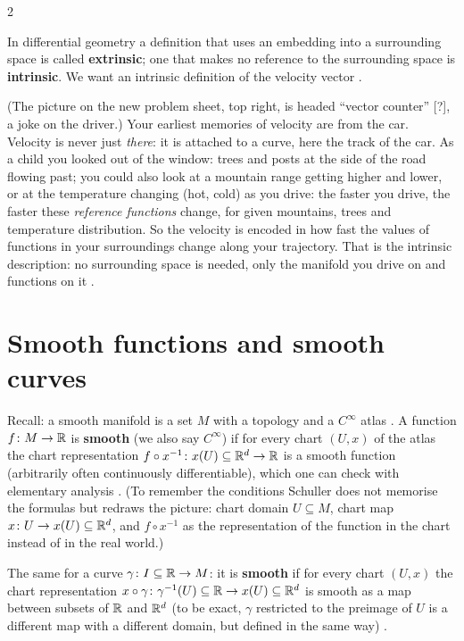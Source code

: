 \begin{paracol}{2}
\begin{definition}\label{def:ts-intrinsic}
In differential geometry a definition that uses an embedding into a surrounding space is called \textbf{extrinsic}; one that
makes no reference to the surrounding space is \textbf{intrinsic}. We want an intrinsic definition of the velocity vector
.
\end{definition}
\begin{intuition}
(The picture on the new problem sheet, top right, is headed ``vector counter'' [?], a joke on the driver.) Your earliest
memories of velocity are from the car. Velocity is never just \emph{there}: it is attached to a curve, here the track of the
car. As a child you looked out of the window: trees and posts at the side of the road flowing past; you could also look
at a mountain range getting higher and lower, or at the temperature changing (hot, cold) as you drive: the faster you drive,
the faster these \emph{reference functions} change, for given mountains, trees and temperature distribution.
So the velocity is encoded in how fast the values of functions in your surroundings change along your trajectory. That is the
intrinsic description: no surrounding space is needed, only the manifold you drive on and functions on it
.
\end{intuition}

\section{Smooth functions and smooth curves}\label{sec:ts-smooth}

Recall: a smooth manifold is a set $M$ with a topology and a $C^\infty$ atlas . A function
$f\colon M\to\mathbb{R}$ is \textbf{smooth} (we also say $C^\infty$) if for every chart $(U,x)$ of the atlas the chart
representation $f\circ x^{-1}\colon x(U)\subseteq\mathbb{R}^d\to\mathbb{R}$ is a smooth function (arbitrarily often continuously
differentiable), which one can check with elementary analysis .
(To remember the conditions Schuller does not memorise the formulas but redraws the picture: chart domain $U\subseteq M$,
chart map $x\colon U\to x(U)\subseteq\mathbb{R}^d$, and $f\circ x^{-1}$ as the representation of the function in the chart instead
of in the real world.)

The same for a curve $\gamma\colon I\subseteq\mathbb{R}\to M$: it is \textbf{smooth} if for every chart $(U,x)$ the chart
representation $x\circ\gamma\colon\gamma^{-1}(U)\subseteq\mathbb{R}\to x(U)\subseteq\mathbb{R}^d$ is smooth as a map between subsets of
$\mathbb{R}$ and $\mathbb{R}^d$ (to be exact, $\gamma$ restricted to the preimage of $U$ is a different map with a different domain, but
defined in the same way) .


\end{paracol}
